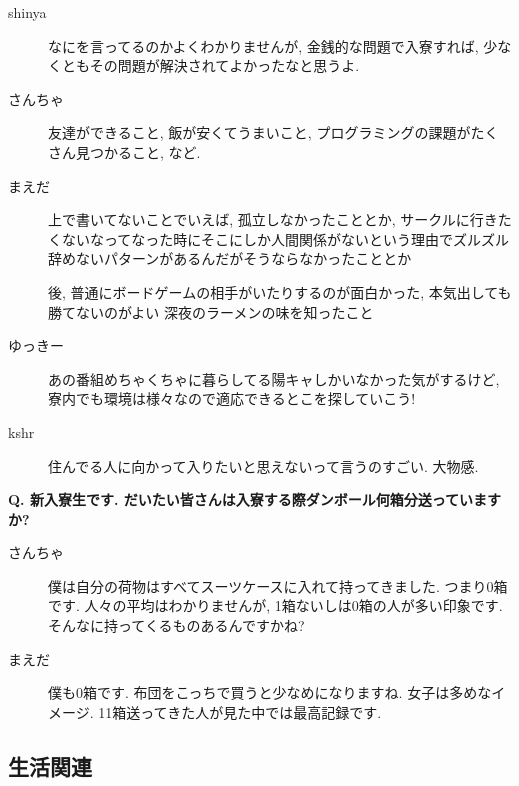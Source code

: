 \documentclass[10pt,b5jsbook,dvips,dvipdfmx,openany]{jsbook}
\theoremstyle{definition}
\begin{document}
		\begin{description}
		\item[shinya]
		なにを言ってるのかよくわかりませんが, 金銭的な問題で入寮すれば, 少なくともその問題が解決されてよかったなと思うよ.

		\item[さんちゃ]
		友達ができること, 飯が安くてうまいこと, プログラミングの課題がたくさん見つかること, など.

		\item[まえだ]
		上で書いてないことでいえば, 孤立しなかったこととか, サークルに行きたくないなってなった時にそこにしか人間関係がないという理由でズルズル辞めないパターンがあるんだがそうならなかったこととか

		後, 普通にボードゲームの相手がいたりするのが面白かった, 本気出しても勝てないのがよい
		深夜のラーメンの味を知ったこと

		\item[ゆっきー]
		あの番組めちゃくちゃに暮らしてる陽キャしかいなかった気がするけど, 寮内でも環境は様々なので適応できるとこを探していこう!

		\item[kshr]
		住んでる人に向かって入りたいと思えないって言うのすごい. 大物感.
		\end{description}

		\begin{tcolorbox}
		\textbf{Q. 新入寮生です. だいたい皆さんは入寮する際ダンボール何箱分送っていますか?}
		\end{tcolorbox}
		\begin{description}
		\item[さんちゃ]
		僕は自分の荷物はすべてスーツケースに入れて持ってきました. つまり0箱です. 人々の平均はわかりませんが, 1箱ないしは0箱の人が多い印象です. そんなに持ってくるものあるんですかね?

		\item[まえだ]
		僕も0箱です. 布団をこっちで買うと少なめになりますね. 女子は多めなイメージ.  11箱送ってきた人が見た中では最高記録です.
		\end{description}






		\subsection{生活関連}
\end{document}
